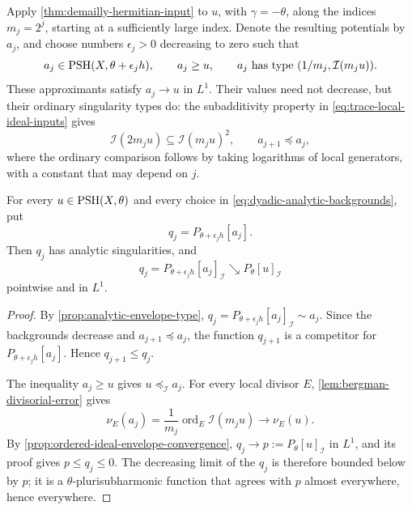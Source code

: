 Apply \cref{thm:demailly-hermitian-input} to $u$, with $\gamma=-\theta$, along the indices $m_j=2^j$, starting at a sufficiently large index. Denote the resulting potentials by $a_j$, and choose numbers $\epsilon_j>0$ decreasing to zero such that
\begin{equation}\label{eq:dyadic-analytic-backgrounds}
 a_j\in\mathrm{PSH}(X,\theta+\epsilon_jh),\qquad
 a_j\geq u,\qquad
 a_j\text{ has type }(1/m_j,\mathcal I(m_ju)).
\end{equation}
These approximants satisfy $a_j\to u$ in $L^1$. Their values need not decrease, but their ordinary singularity types do: the subadditivity property in \eqref{eq:trace-local-ideal-inputs} gives
\[
 \mathcal I(2m_ju)\subseteq\mathcal I(m_ju)^2,
 \qquad a_{j+1}\preceq a_j,
\]
where the ordinary comparison follows by taking logarithms of local generators, with a constant that may depend on $j$.

\begin{theorem}\label{thm:dyadic-analytic-envelope-limit}
For every $u\in\mathrm{PSH}(X,\theta)$ and every choice in \eqref{eq:dyadic-analytic-backgrounds}, put
\[
 q_j=P_{\theta+\epsilon_jh}[a_j].
\]
Then $q_j$ has analytic singularities, and
\[
 q_j=P_{\theta+\epsilon_jh}[a_j]_{\mathcal I}
       \searrow P_\theta[u]_{\mathcal I}
\]
pointwise and in $L^1$.
\end{theorem}
\begin{proof}
By \cref{prop:analytic-envelope-type}, $q_j=P_{\theta+\epsilon_jh}[a_j]_{\mathcal I}\sim a_j$. Since the backgrounds decrease and $a_{j+1}\preceq a_j$, the function $q_{j+1}$ is a competitor for $P_{\theta+\epsilon_jh}[a_j]$. Hence $q_{j+1}\leq q_j$.

The inequality $a_j\geq u$ gives $u\preceq_{\mathcal I}a_j$. For every local divisor $E$, \cref{lem:bergman-divisorial-error} gives
\[
 \nu_E(a_j)=\frac1{m_j}\operatorname{ord}_E\mathcal I(m_ju)
       \longrightarrow\nu_E(u).
\]
By \cref{prop:ordered-ideal-envelope-convergence}, $q_j\to p:=P_\theta[u]_{\mathcal I}$ in $L^1$, and its proof gives $p\leq q_j\leq0$. The decreasing limit of the $q_j$ is therefore bounded below by $p$; it is a $\theta$-plurisubharmonic function that agrees with $p$ almost everywhere, hence everywhere.
\end{proof}

